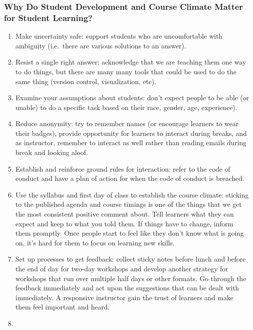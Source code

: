 \subsubsection{Why Do Student Development and Course Climate Matter for
Student
Learning?}\label{why-do-student-development-and-course-climate-matter-for-student-learning}

\begin{enumerate}
\def\labelenumi{\arabic{enumi}.}
\itemsep1pt\parskip0pt
\item
  Make uncertainty safe: support students who are uncomfortable with
  ambiguity (i.e.~there are various solutions to an answer).
\item
  Resist a single right answer: acknowledge that we are teaching them
  one way to do things, but there are many many tools that could be used
  to do the same thing (version control, visualization, etc).
\item
  Examine your assumptions about students: don't expect people to be
  able (or unable) to do a specific task based on their race, gender,
  age, experience).
\item
  Reduce anonymity: try to remember names (or encourage learners to wear
  their badges), provide opportunity for learners to interact during
  breaks, and as instructor, remember to interact as well rather than
  reading emails during break and looking aloof.
\item
  Establish and reinforce ground rules for interaction: refer to the
  code of conduct and have a plan of action for when the code of conduct
  is breached.
\item
  Use the syllabus and first day of class to establish the course
  climate: sticking to the published agenda and course timings is one of
  the things that we get the most consistent positive comment about.
  Tell learners what they can expect and keep to what you told them. If
  things have to change, inform them promptly. Once people start to feel
  like they don't know what is going on, it's hard for them to focus on
  learning new skills.
\item
  Set up processes to get feedback: collect sticky notes before lunch
  and before the end of day for two-day workshops and develop another
  strategy for workshops that run over multiple half days or other
  formats. Go through the feedback immediately and act upon the
  suggestions that can be dealt with immediately. A responsive
  instructor gain the trust of learners and make them feel important and
  heard.
\item

\end{enumerate}
